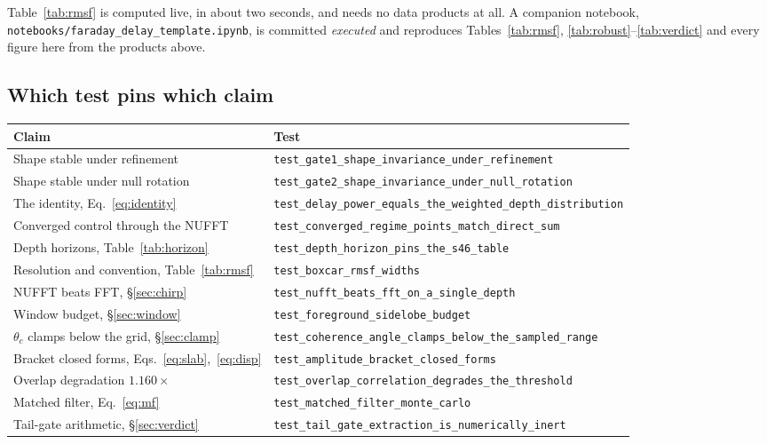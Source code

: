 \documentclass[11pt]{article}
\newcommand{\code}[1]{\texttt{#1}}
\begin{document}
Table~\ref{tab:rmsf} is computed live, in about two seconds, and needs
no data products at all. A companion notebook,
\code{notebooks/faraday\_delay\_template.ipynb}, is committed
\emph{executed} and reproduces Tables~\ref{tab:rmsf},
\ref{tab:robust}--\ref{tab:verdict} and every figure here from the
products above.

\subsection{Which test pins which claim}

\begin{center}
\footnotesize
\begin{tabular}{ll}
\toprule
Claim & Test \\
\midrule
Shape stable under refinement
  & \code{test\_gate1\_shape\_invariance\_under\_refinement} \\
Shape stable under null rotation
  & \code{test\_gate2\_shape\_invariance\_under\_null\_rotation} \\
The identity, Eq.~\eqref{eq:identity}
  & \code{test\_delay\_power\_equals\_the\_weighted\_depth\_distribution} \\
Converged control through the NUFFT
  & \code{test\_converged\_regime\_points\_match\_direct\_sum} \\
Depth horizons, Table~\ref{tab:horizon}
  & \code{test\_depth\_horizon\_pins\_the\_s46\_table} \\
Resolution and convention, Table~\ref{tab:rmsf}
  & \code{test\_boxcar\_rmsf\_widths} \\
NUFFT beats FFT, \S\ref{sec:chirp}
  & \code{test\_nufft\_beats\_fft\_on\_a\_single\_depth} \\
Window budget, \S\ref{sec:window}
  & \code{test\_foreground\_sidelobe\_budget} \\
$\theta_c$ clamps below the grid, \S\ref{sec:clamp}
  & \code{test\_coherence\_angle\_clamps\_below\_the\_sampled\_range} \\
Bracket closed forms, Eqs.~\eqref{eq:slab},~\eqref{eq:disp}
  & \code{test\_amplitude\_bracket\_closed\_forms} \\
Overlap degradation $1.160\times$
  & \code{test\_overlap\_correlation\_degrades\_the\_threshold} \\
Matched filter, Eq.~\eqref{eq:mf}
  & \code{test\_matched\_filter\_monte\_carlo} \\
Tail-gate arithmetic, \S\ref{sec:verdict}
  & \code{test\_tail\_gate\_extraction\_is\_numerically\_inert} \\
\bottomrule
\end{tabular}
\end{center}
\end{document}
